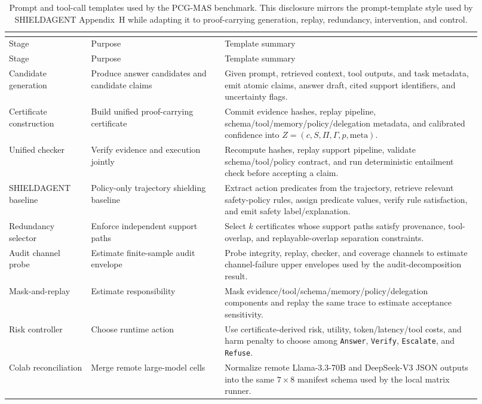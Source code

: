 \begin{longtable}{p{0.16\linewidth}p{0.26\linewidth}p{0.50\linewidth}}
\caption{\small Prompt and tool-call templates used by the PCG-MAS benchmark. This disclosure mirrors the prompt-template style used by SHIELDAGENT Appendix~H while adapting it to proof-carrying generation, replay, redundancy, intervention, and control.}\\
\label{tab:appendix_prompt_bank}\\
\toprule
Stage & Purpose & Template summary \\
\midrule
\endfirsthead
\toprule
Stage & Purpose & Template summary \\
\midrule
\endhead
Candidate generation & Produce answer candidates and candidate claims & Given prompt, retrieved context, tool outputs, and task metadata, emit atomic claims, answer draft, cited support identifiers, and uncertainty flags. \\
Certificate construction & Build unified proof-carrying certificate & Commit evidence hashes, replay pipeline, schema/tool/memory/policy/delegation metadata, and calibrated confidence into \(Z=(c,S,\Pi,\Gamma,p,\mathrm{meta})\). \\
Unified checker & Verify evidence and execution jointly & Recompute hashes, replay support pipeline, validate schema/tool/policy contract, and run deterministic entailment check before accepting a claim. \\
SHIELDAGENT baseline & Policy-only trajectory shielding baseline & Extract action predicates from the trajectory, retrieve relevant safety-policy rules, assign predicate values, verify rule satisfaction, and emit safety label/explanation. \\
Redundancy selector & Enforce independent support paths & Select \(k\) certificates whose support paths satisfy provenance, tool-overlap, and replayable-overlap separation constraints. \\
Audit channel probe & Estimate finite-sample audit envelope & Probe integrity, replay, checker, and coverage channels to estimate channel-failure upper envelopes used by the audit-decomposition result. \\
Mask-and-replay & Estimate responsibility & Mask evidence/tool/schema/memory/policy/delegation components and replay the same trace to estimate acceptance sensitivity. \\
Risk controller & Choose runtime action & Use certificate-derived risk, utility, token/latency/tool costs, and harm penalty to choose among \texttt{Answer}, \texttt{Verify}, \texttt{Escalate}, and \texttt{Refuse}. \\
Colab reconciliation & Merge remote large-model cells & Normalize remote Llama-3.3-70B and DeepSeek-V3 JSON outputs into the same \(7\times8\) manifest schema used by the local matrix runner. \\
\bottomrule
\end{longtable}
